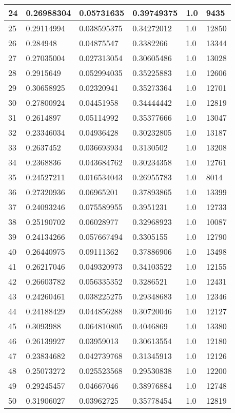 \begin{longtable}{|l|l|l|l|l|l|}
24 & 0.26988304 & 0.05731635 & 0.39749375 & 1.0 & 9435 \\ \hline 
25 & 0.29114994 & 0.038595375 & 0.34272012 & 1.0 & 12850 \\ \hline 
26 & 0.284948 & 0.04875547 & 0.3382266 & 1.0 & 13344 \\ \hline 
27 & 0.27035004 & 0.027313054 & 0.30605486 & 1.0 & 13028 \\ \hline 
28 & 0.2915649 & 0.052994035 & 0.35225883 & 1.0 & 12606 \\ \hline 
29 & 0.30658925 & 0.02320941 & 0.35273364 & 1.0 & 12701 \\ \hline 
30 & 0.27800924 & 0.04451958 & 0.34444442 & 1.0 & 12819 \\ \hline 
31 & 0.2614897 & 0.05114992 & 0.35377666 & 1.0 & 13047 \\ \hline 
32 & 0.23346034 & 0.04936428 & 0.30232805 & 1.0 & 13187 \\ \hline 
33 & 0.2637452 & 0.036693934 & 0.3130502 & 1.0 & 13208 \\ \hline 
34 & 0.2368836 & 0.043684762 & 0.30234358 & 1.0 & 12761 \\ \hline 
35 & 0.24527211 & 0.016534043 & 0.26955783 & 1.0 & 8014 \\ \hline 
36 & 0.27320936 & 0.06965201 & 0.37893865 & 1.0 & 13399 \\ \hline 
37 & 0.24093246 & 0.075589955 & 0.3951231 & 1.0 & 12733 \\ \hline 
38 & 0.25190702 & 0.06028977 & 0.32968923 & 1.0 & 10087 \\ \hline 
39 & 0.24134266 & 0.057667494 & 0.3305155 & 1.0 & 12790 \\ \hline 
40 & 0.26440975 & 0.09111362 & 0.37886906 & 1.0 & 13498 \\ \hline 
41 & 0.26217046 & 0.049320973 & 0.34103522 & 1.0 & 12155 \\ \hline 
42 & 0.26603782 & 0.056335352 & 0.3286521 & 1.0 & 12431 \\ \hline 
43 & 0.24260461 & 0.038225275 & 0.29348683 & 1.0 & 12346 \\ \hline 
44 & 0.24188429 & 0.044856288 & 0.30720046 & 1.0 & 12127 \\ \hline 
45 & 0.3093988 & 0.064810805 & 0.4046869 & 1.0 & 13380 \\ \hline 
46 & 0.26139927 & 0.03959013 & 0.30613554 & 1.0 & 12180 \\ \hline 
47 & 0.23834682 & 0.042739768 & 0.31345913 & 1.0 & 12126 \\ \hline 
48 & 0.25073272 & 0.025523568 & 0.29530838 & 1.0 & 12200 \\ \hline 
49 & 0.29245457 & 0.04667046 & 0.38976884 & 1.0 & 12748 \\ \hline 
50 & 0.31906027 & 0.03962725 & 0.35778454 & 1.0 & 12819 \\ \hline 
\end{longtable}